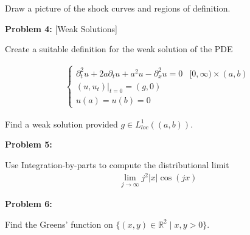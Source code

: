 \documentclass{article}
\newcommand{\R}{{\mathbb{R}}}
\newcommand{\pd}{\partial}
\begin{document}
	Draw a picture of the shock curves and regions of definition. 
	
	
	\textbf{Problem 4:} [Weak Solutions]
	
	Create a suitable definition for the weak solution of the PDE
	
	\begin{align*}
		\begin{cases}
			\pd_{t}^{2} u + 2a \pd_{t}u + a^{2}u - \pd_{x}^{2} u = 0 & [0,\infty) \times (a,b) \\
			(u,u_{t})|_{t=0} = (g,0) \\
			u(a)=u(b)=0
		\end{cases}
	\end{align*} 

	Find a weak solution provided $g \in L^{1}_{loc}((a,b))$. 
	
	\textbf{Problem 5:}
	
	Use Integration-by-parts to compute the distributional limit 
	\begin{align*}
		\lim_{j \to \infty} j^{2}|x|\cos(jx)
	\end{align*}
	
	
	\textbf{Problem 6:}
	
	Find the Greens' function on $\{(x,y) \in \R^{2} \mid x,y > 0\}$. 
	
\end{document}
